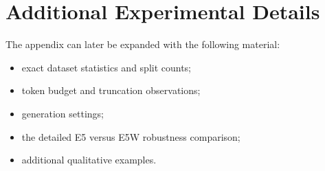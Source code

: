\documentclass{article}
\newcommand{\expid}[1]{\textsc{#1}}
\begin{document}
\section{Additional Experimental Details}

The appendix can later be expanded with the following material:
\begin{itemize}
\item exact dataset statistics and split counts;
\item token budget and truncation observations;
\item generation settings;
\item the detailed \expid{E5} versus \expid{E5W} robustness comparison;
\item additional qualitative examples.
\end{itemize}


\end{document}
